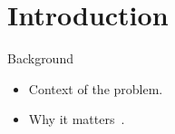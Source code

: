 \section{Introduction}
\begin{frame}{Background}
  \begin{itemize}
    \item Context of the problem.
    \item Why it matters~\cite{example2020}.
  \end{itemize}
\end{frame}
